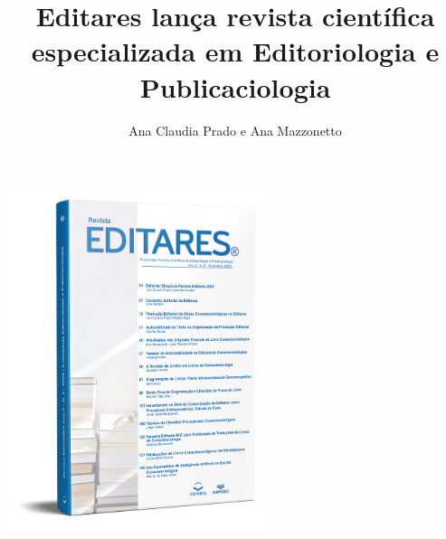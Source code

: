 \documentclass{gescons}
\author{Ana Claudia Prado e Ana Mazzonetto}
\title{Editares lança revista científica especializada em Editoriologia e Publicaciologia}
\begin{document}
    \makeentrevistatitle


    
    
\begin{center}
    \includegraphics[height=10cm]{articles/atualizacoes/fotos/materia6/revista_editares_2025.png} 
\end{center}
    
\end{document}
